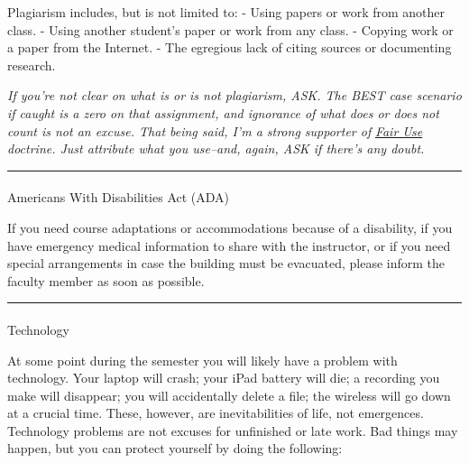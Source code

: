 \documentclass[
  letterpaper,
  DIV=11,
  numbers=noendperiod,
  oneside]{scrartcl}
\makeatletter
\let\oldparagraph\paragraph
\renewcommand{\paragraph}{
    \@ifstar
      \xxxParagraphStar
      \xxxParagraphNoStar
  }
\newcommand{\xxxParagraphStar}[1]{\oldparagraph*{#1}\mbox{}}
\newcommand{\xxxParagraphNoStar}[1]{\oldparagraph{#1}\mbox{}}
\makeatother
\begin{document}
Plagiarism includes, but is not limited to: - Using papers or work from
another class. - Using another student's paper or work from any class. -
Copying work or a paper from the Internet. - The egregious lack of
citing sources or documenting research.

\emph{If you're not clear on what is or is not plagiarism, ASK. The BEST
case scenario if caught is a zero on that assignment, and ignorance of
what does or does not count is not an excuse. That being said, I'm a
strong supporter of}
\href{https://en.wikipedia.org/wiki/Fair_Use}{\emph{Fair Use}}
\emph{doctrine. Just attribute what you use--and, again, ASK if there's
any doubt.}

\begin{center}\rule{0.5\linewidth}{0.5pt}\end{center}

\paragraph{Americans With Disabilities Act
(ADA)}\label{americans-with-disabilities-act-ada}

If you need course adaptations or accommodations because of a
disability, if you have emergency medical information to share with the
instructor, or if you need special arrangements in case the building
must be evacuated, please inform the faculty member as soon as possible.

\begin{center}\rule{0.5\linewidth}{0.5pt}\end{center}

\paragraph{Technology}\label{technology}

At some point during the semester you will likely have a problem with
technology. Your laptop will crash; your iPad battery will die; a
recording you make will disappear; you will accidentally delete a file;
the wireless will go down at a crucial time. These, however, are
inevitabilities of life, not emergences. Technology problems are not
excuses for unfinished or late work. Bad things may happen, but you can
protect yourself by doing the following:
\end{document}
